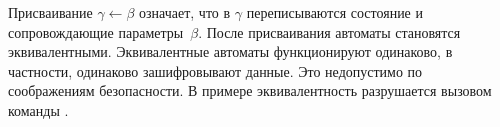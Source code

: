Присваивание $\gamma\leftarrow\beta$ означает, что в $\gamma$ переписываются 
состояние и сопровождающие параметры~$\beta$. 
%
После присваивания автоматы становятся эквивалентными. Эквивалентные автоматы 
функционируют одинаково, в частности, одинаково зашифровывают данные. 
Это недопустимо по соображениям безопасности.
%
В примере эквивалентность разрушается вызовом команды .

